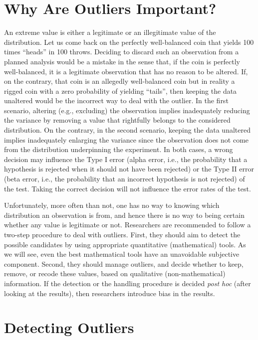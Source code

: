 \documentclass[man,floatsintext]{apa6}
\begin{document}
\hypertarget{why-are-outliers-important}{%
\section{Why Are Outliers Important?}\label{why-are-outliers-important}}

An extreme value is either a legitimate or an illegitimate value of the distribution. Let us come back on the perfectly well-balanced coin that yields 100 times \enquote{heads} in 100 throws. Deciding to discard such an observation from a planned analysis would be a mistake in the sense that, if the coin is perfectly well-balanced, it is a legitimate observation that has no reason to be altered. If, on the contrary, that coin is an allegedly well-balanced coin but in reality a rigged coin with a zero probability of yielding \enquote{tails}, then keeping the data unaltered would be the incorrect way to deal with the outlier. In the first scenario, altering (e.g., excluding) the observation implies inadequately reducing the variance by removing a value that rightfully belongs to the considered distribution. On the contrary, in the second scenario, keeping the data unaltered implies inadequately enlarging the variance since the observation does not come from the distribution underpinning the experiment. In both cases, a wrong decision may influence the Type I error (alpha error, i.e., the probability that a hypothesis is rejected when it should not have been rejected) or the Type II error (beta error, i.e., the probability that an incorrect hypothesis is not rejected) of the test. Taking the correct decision will not influence the error rates of the test.

Unfortunately, more often than not, one has no way to knowing which distribution an observation is from, and hence there is no way to being certain whether any value is legitimate or not. Researchers are recommended to follow a two-step procedure to deal with outliers. First, they should aim to detect the possible candidates by using appropriate quantitative (mathematical) tools. As we will see, even the best mathematical tools have an unavoidable subjective component. Second, they should manage outliers, and decide whether to keep, remove, or recode these values, based on qualitative (non-mathematical) information. If the detection or the handling procedure is decided \emph{post hoc} (after looking at the results), then researchers introduce bias in the results.

\hypertarget{detecting-outliers}{%
\section{Detecting Outliers}\label{detecting-outliers}}
\end{document}
